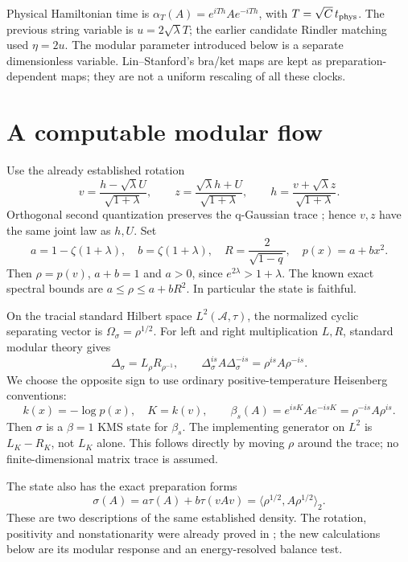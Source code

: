 \documentclass[11pt]{article}
\newcommand{\tr}{\tau}
\newcommand{\A}{\mathcal A}
\begin{document}
Physical Hamiltonian time is $\alpha_T(A)=e^{iTh}Ae^{-iTh}$,
with $T=\sqrt C\,t_{\rm phys}$. The previous string variable is
$u=2\sqrt\lambda T$; the earlier candidate Rindler matching used
$\eta=2u$. The modular parameter introduced below is a separate
dimensionless variable. Lin--Stanford's bra/ket maps
\cite[(158)--(159)]{LS} are kept as preparation-dependent maps;
they are not a uniform rescaling of all these clocks.

\newpage
\section{A computable modular flow}
Use the already established rotation
\begin{equation}\label{rotation}
 v=\frac{h-\sqrt\lambda U}{\sqrt{1+\lambda}},\qquad
 z=\frac{\sqrt\lambda h+U}{\sqrt{1+\lambda}},\qquad
 h=\frac{v+\sqrt\lambda z}{\sqrt{1+\lambda}}.
\end{equation}
Orthogonal second quantization preserves the q-Gaussian trace
\cite[Theorem 2.11]{BKS}; hence $v,z$ have the same joint law
as $h,U$. Set
\begin{equation}\label{ab}
 a=1-\zeta(1+\lambda),\quad b=\zeta(1+\lambda),\quad
 R=\frac2{\sqrt{1-q}},\quad p(x)=a+bx^2.
\end{equation}
Then $\rho=p(v)$, $a+b=1$ and $a>0$, since
$e^{2\lambda}>1+\lambda$. The known exact spectral bounds are
$a\le\rho\le a+bR^2$. In particular the state is faithful.

On the tracial standard Hilbert space $L^2(\A,\tr)$, the
normalized cyclic separating vector is $\Omega_\sigma=\rho^{1/2}$.
For left and right multiplication $L,R$, standard modular theory
\cite[Sec.~4.2]{Witten} gives
\[
 \Delta_\sigma=L_\rho R_{\rho^{-1}},\qquad
 \Delta_\sigma^{is}A\Delta_\sigma^{-is}=\rho^{is}A\rho^{-is}.
\]
We choose the opposite sign to use ordinary positive-temperature
Heisenberg conventions:
\begin{equation}\label{flow}
 k(x)=-\log p(x),\quad K=k(v),\qquad
 \beta_s(A)=e^{isK}Ae^{-isK}=\rho^{-is}A\rho^{is}.
\end{equation}
Then $\sigma$ is a $\beta=1$ KMS state for $\beta_s$.
The implementing generator on $L^2$ is $L_K-R_K$, not $L_K$
alone. This follows directly by moving $\rho$ around the trace;
no finite-dimensional matrix trace is assumed.

The state also has the exact preparation forms
\begin{equation}\label{prep}
 \sigma(A)=a\tr(A)+b\tr(vAv)
           =\langle\rho^{1/2},A\rho^{1/2}\rangle_2.
\end{equation}
These are two descriptions of the same established density.
The rotation, positivity and nonstationarity were already proved
in \cite{selected}; the new calculations below are its modular
response and an energy-resolved balance test.
\end{document}
